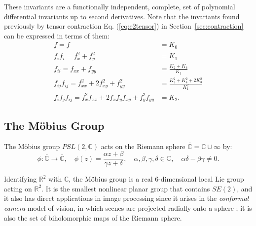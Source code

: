 \documentclass[review,onefignum,onetabnum]{siamonline190516}
\def\R{\mathbb{R}}
\begin{document}
These invariants are a functionally independent, complete, set of
polynomial differential invariants up to second derivatives. Note that the
invariants found previously by tensor contraction Eq. (\ref{eq:e2tensor}) in
Section~\ref{sec:contraction} can be expressed in terms of them:
\begin{align*}
  f = f &= K_0 \\
  f_if_i = f_x^2 + f_y^2 &= K_1 \\
  f_{ii} = f_{xx} + f_{yy} &= \frac{K_2 + K_4}{K_1} \\
  f_{ij} f_{ij} = f_{xx}^2 + 2f_{xy}^2 + f_{yy}^2 &= \frac{K_2^2 + K_4^2 + 2K_3^2}{K_1^2} \\
  f_i f_j f_{ij} = f_x^2 f_{xx} + 2f_x f_y f_{xy} + f_y^2 f_{yy} &= K_2.
\end{align*}

\subsection{The M\"{o}bius Group}

The M\"obius group $PSL(2,\mathbb{C})$ acts on the Riemann sphere $\overline{\mathbb{C}} = \mathbb{C}\cup\infty$ by:
\begin{equation} 
\phi\colon \overline{\mathbb{C}} \to \overline{\mathbb{C}},\quad \phi(z) = \frac{\alpha z + \beta}{\gamma z + \delta},\quad \alpha,\beta,\gamma,\delta\in\mathbb{C}, \quad
\alpha\delta-\beta\gamma\ne 0.
\end{equation}

Identifying $\R^2$ with $\mathbb{C}$, the M\"obius group is a real 6-dimensional local Lie group acting on $\mathbb{R}^2$. 
It is the smallest nonlinear planar group that contains $SE(2)$, and it also has direct applications in image processing since it arises in the {\em conformal camera} model of vision, in which scenes are projected radially onto a sphere \citep{Lenz1990,Turski2004}; it is also the set of biholomorphic maps of the Riemann sphere. 
\end{document}
